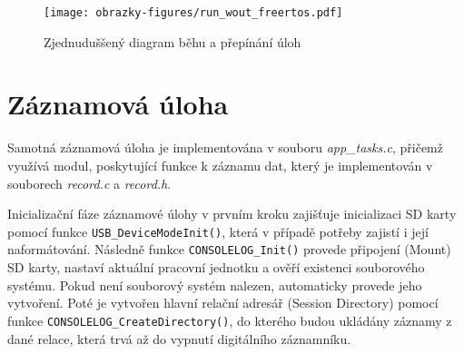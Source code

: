 \begin{figure}[h]
    \centering
    \texttt{[image: obrazky-figures/run\_wout\_freertos.pdf]}
    
    \caption{Zjednuduššený diagram běhu a přepínání úloh}
    \label{fig:run-wout-freertos}
\end{figure}

\newpage

\section{Záznamová úloha}
\label{zaznamove_vlakno}
Samotná záznamová úloha je implementována v souboru \textit{app\_tasks.c}, přičemž využívá modul, poskytující funkce k záznamu dat, který je implementován v souborech \textit{record.c} a \textit{record.h}. 

Inicializační fáze záznamové úlohy v prvním kroku zajišťuje inicializaci SD karty pomocí funkce \texttt{USB\_DeviceModeInit()}, která v případě potřeby zajistí i její naformátování. Následně funkce \texttt{CONSOLELOG\_Init()} provede připojení (Mount) SD karty, nastaví aktuální pracovní jednotku a ověří existenci souborového systému. Pokud není souborový systém nalezen, automaticky provede jeho vytvoření. Poté je vytvořen hlavní relační adresář (Session Directory) pomocí funkce \texttt{CONSOLELOG\_CreateDirectory()}, do kterého budou ukládány záznamy z dané relace, která trvá až do vypnutí digitálního záznamníku.


